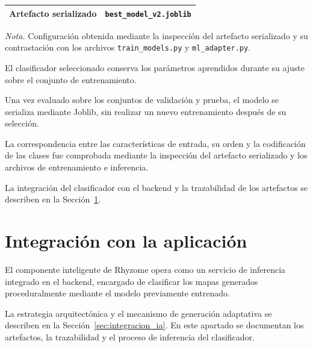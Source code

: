 \begin{table}[htbp]
\begin{tabularx}{\textwidth}{
			|>{\raggedright\arraybackslash}p{5cm}|
			>{\raggedright\arraybackslash}X|
		}
		Artefacto serializado &
		\texttt{best\_model\_v2.joblib}
		\\ \hline
		
	\end{tabularx}
	
	\vspace{0.2cm}
	
	\begin{minipage}{\textwidth}
		\footnotesize
		\textit{Nota.} Configuración obtenida mediante la inspección del artefacto serializado y su contrastación con los archivos \texttt{train\_models.py} y \texttt{ml\_adapter.py}.
	\end{minipage}
	
\end{table}

\FloatBarrier

El clasificador seleccionado conserva los parámetros aprendidos durante su ajuste sobre el conjunto de entrenamiento.

Una vez evaluado sobre los conjuntos de validación y prueba, el modelo se serializa mediante Joblib, sin realizar un nuevo entrenamiento después de su selección.

La correspondencia entre las características de entrada, su orden y la codificación de las clases fue comprobada mediante la inspección del artefacto serializado y los archivos de entrenamiento e inferencia.

La integración del clasificador con el backend y la trazabilidad de los artefactos se describen en la Sección~\ref{sec:integracion_aplicacion_ia}.

\FloatBarrier


\section{Integración con la aplicación}
\label{sec:integracion_aplicacion_ia}

El componente inteligente de Rhyzome opera como un servicio de inferencia integrado en el backend, encargado de clasificar los mapas generados proceduralmente mediante el modelo previamente entrenado.

La estrategia arquitectónica y el mecanismo de generación adaptativa se describen en la Sección~\ref{sec:integracion_ia}. En este apartado se documentan los artefactos, la trazabilidad y el proceso de inferencia del clasificador.

